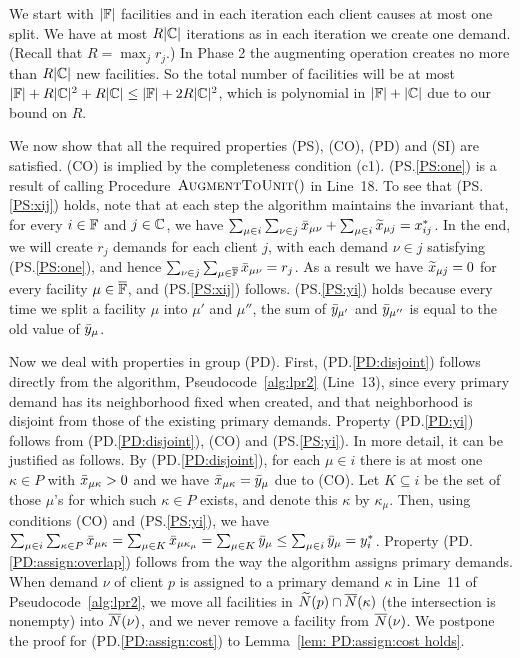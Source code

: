\documentclass{llncs}
\begin{document}


We start with $|\mathbb{F}|$ facilities and in each iteration 
 each client causes at most one split.  We have at most
$R|\mathbb{C}|$ iterations as in each iteration we create one
demand. (Recall that $R = \max_jr_j$.) In Phase 2 the augmenting
operation creates no more than $R|\mathbb{C}|$ new facilities.  So the
total number of facilities will be at most $|\mathbb{F}|+
R|\mathbb{C}|^2 + R|\mathbb{C}| \leq |\mathbb{F}| + 2R|\mathbb{C}|^2$,
which is polynomial in $|\mathbb{F}|+|\mathbb{C}|$ due to our bound on
$R$.


\medskip

  We now show that all the required
properties (PS), (CO), (PD) and (SI) are satisfied.  (CO) is implied
by the completeness condition (c1). (PS.\ref{PS:one}) is a result of
calling Procedure~${\textsc{AugmentToUnit}}()$ in Line~18. To see that
(PS.\ref{PS:xij}) holds, note that at each step the algorithm
maintains the invariant that, for every $i\in\mathbb{F}$ and
$j\in\mathbb{C}$, we have $\sum_{\mu\in i}\sum_{\nu \in j} {\bar x}_{\mu
  \nu} + \sum_{\mu\in i} {\widetilde x}_{\mu j} = x_{ij}^\ast$. In the end,
we will create $r_j$ demands for each client $j$, with each demand
$\nu\in j$ satisfying (PS.\ref{PS:one}), and hence $\sum_{\nu\in
  j}\sum_{\mu\in\overline{\mathbb{F}}}{\bar x}_{\mu\nu}=r_j$.  As a result we have
${\widetilde x}_{\mu j}=0$ for every facility $\mu\in\overline{\mathbb{F}}$, and
(PS.\ref{PS:xij}) follows.  (PS.\ref{PS:yi}) holds because every time
we split a facility $\mu$ into $\mu'$ and $\mu''$, the sum of
${\bar y}_{\mu'}$ and ${\bar y}_{\mu''}$ is equal to the old value of
${\bar y}_{\mu}$.

Now we deal with properties in group (PD).  First,
(PD.\ref{PD:disjoint}) follows directly from the algorithm,
Pseudocode~\ref{alg:lpr2} (Line~13), since every primary demand has
its neighborhood fixed when created, and that neighborhood is disjoint
from those of the existing primary demands. Property (PD.\ref{PD:yi})
follows from (PD.\ref{PD:disjoint}), (CO) and (PS.\ref{PS:yi}). In
more detail, it can be justified as follows. By
(PD.\ref{PD:disjoint}), for each $\mu\in i$ there is at most one
$\kappa\in P$ with ${\bar x}_{\mu\kappa} > 0$ and we have
${\bar x}_{\mu\kappa} = {\bar y}_{\mu}$ due to (CO).  Let $K\subseteq i$ be
the set of those $\mu$'s for which such $\kappa\in P$ exists, and
denote this $\kappa$ by $\kappa_\mu$. Then, using conditions (CO) and
(PS.\ref{PS:yi}), we have $ \sum_{\mu\in i}\sum_{\kappa\in
  P}{\bar x}_{\mu\kappa} = \sum_{\mu\in K}{\bar x}_{\mu\kappa_\mu} =
\sum_{\mu\in K}{\bar y}_{\mu} \leq \sum_{\mu\in i} {\bar y}_{\mu} =
y_i^\ast$. Property (PD.\ref{PD:assign:overlap}) follows from the way
the algorithm assigns primary demands.  When demand $\nu$ of client
$p$ is assigned to a primary demand $\kappa$ in Line~11 of
Pseudocode~\ref{alg:lpr2}, we move all facilities in ${\widetilde N}(p)\cap
{\overline{N}}(\kappa)$ (the intersection is nonempty) into ${\overline{N}}(\nu)$, and
we never remove a facility from ${\overline{N}}(\nu)$.  We postpone the proof
for (PD.\ref{PD:assign:cost}) to Lemma~\ref{lem: PD:assign:cost
  holds}.
\end{document}
